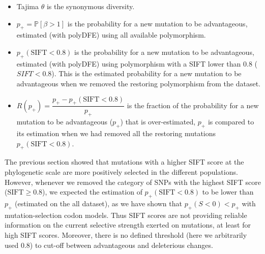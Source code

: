 \documentclass{article}
\newcommand{\proba}{\mathbb{P}}
\newcommand{\Sphy}{S}
\newcommand{\Spop}{\beta}
\newcommand{\polyAdv}{ \Spop > 1}
\newcommand{\PpolyAdv}{\proba \left[ \polyAdv \right]}
\begin{document}
    \begin{itemize}
        \item Tajima $\theta$ is the synonymous diversity.
        \item $p_+=\PpolyAdv$ is the probability for a new mutation to be advantageous, estimated (with polyDFE) using all available polymorphism.
        \item $p_+ (\textrm{SIFT} < 0.8)$ is the probability for a new mutation to be advantageous, estimated (with polyDFE) using polymorphism with a SIFT lower than 0.8 ($SIFT < 0.8$).
        This is the estimated probability for a new mutation to be advantageous when we removed the restoring polymorphism from the dataset.
        \item $R(p_+)=\dfrac{p_+ - p_+ (\textrm{SIFT} < 0.8)}{p_+}$ is the fraction of the probability for a new mutation to be advantageous ($p_+$) that is over-estimated, $p_+$ is compared to its estimation when we had removed all the restoring mutations $p_+ (\textrm{SIFT} < 0.8)$.
    \end{itemize}

    The previous section showed that mutations with a higher SIFT score at the phylogenetic scale are more positively selected in the different populations.
    However, whenever we removed the category of SNPs with the highest SIFT score ($\textrm{SIFT} \geq 0.8$), we expected the estimation of $p_+ (\textrm{SIFT} < 0.8)$ to be lower than $p_+$ (estimated on the all dataset), as we have shown that $p_+ (\Sphy < 0) < p_+$ with mutation-selection codon models.
    Thus SIFT scores are not providing reliable information on the current selective strength exerted on mutations, at least for high SIFT scores.
    Moreover, there is no defined threshold (here we arbitrarily used 0.8) to cut-off between advantageous and deleterious changes.

    \newpage
\end{document}
